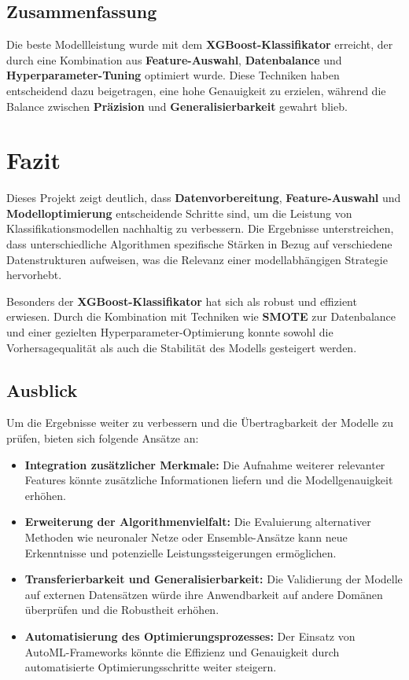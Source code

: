 \documentclass[a4paper,12pt]{article}
\begin{document}
\subsection{Zusammenfassung}
Die beste Modellleistung wurde mit dem \textbf{XGBoost-Klassifikator} erreicht, der durch eine Kombination aus \textbf{Feature-Auswahl}, \textbf{Datenbalance} und \textbf{Hyperparameter-Tuning} optimiert wurde. Diese Techniken haben entscheidend dazu beigetragen, eine hohe Genauigkeit zu erzielen, während die Balance zwischen \textbf{Präzision} und \textbf{Generalisierbarkeit} gewahrt blieb.

\section{Fazit}
Dieses Projekt zeigt deutlich, dass \textbf{Datenvorbereitung}, \textbf{Feature-Auswahl} und \textbf{Modelloptimierung} entscheidende Schritte sind, um die Leistung von Klassifikationsmodellen nachhaltig zu verbessern. Die Ergebnisse unterstreichen, dass unterschiedliche Algorithmen spezifische Stärken in Bezug auf verschiedene Datenstrukturen aufweisen, was die Relevanz einer modellabhängigen Strategie hervorhebt.

\noindent
Besonders der \textbf{XGBoost-Klassifikator} hat sich als robust und effizient erwiesen. Durch die Kombination mit Techniken wie \textbf{SMOTE} zur Datenbalance und einer gezielten Hyperparameter-Optimierung konnte sowohl die Vorhersagequalität als auch die Stabilität des Modells gesteigert werden.

\subsection*{Ausblick}
Um die Ergebnisse weiter zu verbessern und die Übertragbarkeit der Modelle zu prüfen, bieten sich folgende Ansätze an:
\begin{itemize}
    \item \textbf{Integration zusätzlicher Merkmale:} Die Aufnahme weiterer relevanter Features könnte zusätzliche Informationen liefern und die Modellgenauigkeit erhöhen.
    \item \textbf{Erweiterung der Algorithmenvielfalt:} Die Evaluierung alternativer Methoden wie neuronaler Netze oder Ensemble-Ansätze kann neue Erkenntnisse und potenzielle Leistungssteigerungen ermöglichen.
    \item \textbf{Transferierbarkeit und Generalisierbarkeit:} Die Validierung der Modelle auf externen Datensätzen würde ihre Anwendbarkeit auf andere Domänen überprüfen und die Robustheit erhöhen.
    \item \textbf{Automatisierung des Optimierungsprozesses:} Der Einsatz von AutoML-Frameworks könnte die Effizienz und Genauigkeit durch automatisierte Optimierungsschritte weiter steigern.
\end{itemize}
\end{document}
